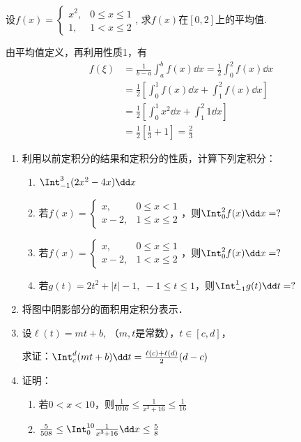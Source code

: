 \begin{example}
  设$f(x)=\begin{cases}
      x^2,& 0\le x\le 1\\
      1,& 1<x\le 2
  \end{cases}$,  求$f(x)$在$[0,2]$上的平均值.
\end{example}

\begin{solution}
由平均值定义，再利用性质1，有    
\begin{align*}
    f(\xi)&=\frac{1}{b-a}\int^b_a f(x)\dd x=\frac{1}{2}\int^2_0 f(x)\dd x\\
    &=\frac{1}{2}\left[\int^1_0 f(x)\dd x+\int^2_1 f(x)\dd x\right]\\
    &=\frac{1}{2}\left[\int^1_0 x^2\dd x+\int^2_1 1\dd x\right]\\
    &=\frac{1}{2}\left[\frac{1}{3}+1\right]=\frac{2}{3}
\end{align*}
\end{solution}

\begin{ex}
\begin{enumerate}
    \item 利用以前定积分的结果和定积分的性质，计算下列定积分：
\begin{enumerate}
    \item $\Int^3_{-1}(2x^2-4x)\dd x$
    \item 若$f(x)=\begin{cases}
        x,& 0\le x<1\\
        x-2,& 1\le x\le 2
    \end{cases}$，则$\Int^2_0 f(x)\dd x=?$
    \item 若$f(x)=\begin{cases}
        x,& 0\le x\le 1\\
        x-2,& 1< x\le 2
    \end{cases}$，则$\Int^2_0 f(x)\dd x=?$
\item 若$g(t)=2t^2+|t|-1,\; -1\le t\le 1$，则$\Int^1_{-1} g(t)\dd t=?$
\end{enumerate}

\item 将图中阴影部分的面积用定积分表示．
\item 设$\ell(t)=mt+b$, （$m,t$是常数），$t\in [c,d]$，

求证：$\Int^d_c (mt+b)\dd t=\frac{\ell(c)+\ell(d)}{2}(d-c)$
\item 证明：
\begin{enumerate}
    \item 若$0<x<10$，则$\frac{1}{1016}\le\frac{1}{x^3+16}\le \frac{1}{16}$
    \item $\frac{5}{508}\le \Int^{10}_0\frac{1}{x^3+16}\dd x\le \frac{5}{8}$
\end{enumerate}
\end{enumerate}
\end{ex}

